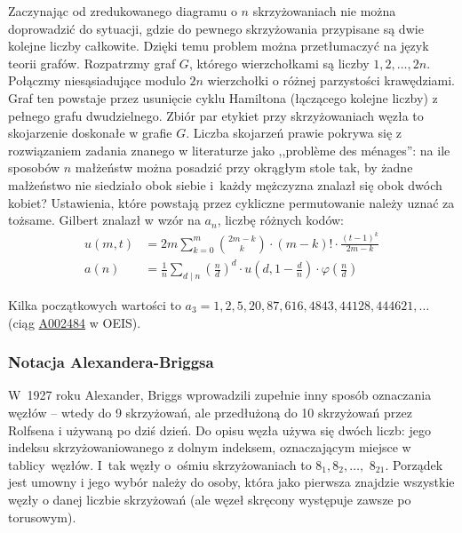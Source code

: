 Zaczynając od zredukowanego diagramu o $n$ skrzyżowaniach nie można doprowadzić do sytuacji, gdzie do pewnego skrzyżowania przypisane są dwie kolejne liczby całkowite.
Dzięki temu problem można przetłumaczyć na język teorii grafów.
Rozpatrzmy graf $G$, którego wierzchołkami są liczby $1, 2, \ldots, 2n$.
Połączmy niesąsiadujące modulo $2n$ wierzchołki o różnej parzystości krawędziami.
Graf ten powstaje przez usunięcie cyklu Hamiltona (łączącego kolejne liczby) z pełnego grafu dwudzielnego.
Zbiór par etykiet przy skrzyżowaniach węzła to skojarzenie doskonałe w grafie $G$.
Liczba skojarzeń prawie pokrywa się z rozwiązaniem zadania znanego w literaturze jako ,,problème des ménages'': na ile sposobów $n$ małżeństw można posadzić przy okrągłym stole tak, by żadne małżeństwo nie siedziało obok siebie i~każdy mężczyzna znalazł się obok dwóch kobiet?
Ustawienia, które powstają przez cykliczne permutowanie należy uznać za tożsame.
Gilbert znalazł w \cite{gilbert56} wzór na $a_n$, liczbę różnych kodów:
\begin{align}
u(m, t) & = 2m \sum_{k=0}^m {2m-k \choose k} \cdot (m-k)! \cdot \frac{(t-1)^k}{2m - k}  \\
a(n) & = \frac{1}{n} \sum_{d\mid n} \left(\frac{n}{d}\right)^d \cdot u \left(d, 1 - \frac{d}{n}\right) \cdot \varphi \left(\frac{n}{d}\right)
\end{align}

Kilka początkowych wartości to $a_3 = 1, 2, 5, 20, 87, 616, 4843, 44128, 444621, \ldots$ (ciąg \href{https://oeis.org/A002484}{A002484} w OEIS).

%

\subsubsection{Notacja Alexandera-Briggsa}
\label{sss:alexander_briggs}%
%
W~1927 roku Alexander, Briggs wprowadzili zupełnie inny sposób oznaczania węzłów -- wtedy do 9 skrzyżowań, ale przedłużoną do 10 skrzyżowań przez Rolfsena i używaną po dziś dzień.
Do opisu węzła używa się dwóch liczb: jego indeksu skrzyżowaniowanego z dolnym indeksem, oznaczającym miejsce w tablicy~węzłów.
I~tak węzły o~ośmiu skrzyżowaniach to $8_1, 8_2, \ldots,$ $8_{21}$.
Porządek jest umowny i jego wybór należy do osoby, która jako pierwsza znajdzie wszystkie węzły o danej liczbie skrzyżowań (ale węzeł skręcony występuje zawsze po torusowym).
%
%

